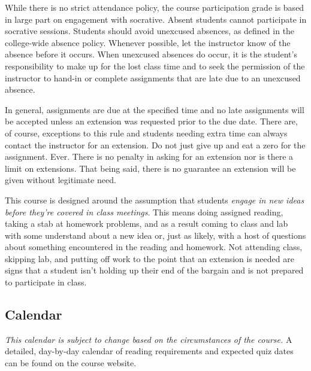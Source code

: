 \documentclass[10pt]{article}
\begin{document}
While there is no strict attendance policy, the course participation grade is based in large part on engagement with socrative. Absent students cannot participate in socrative sessions.  Students should avoid unexcused absences, as defined in the college-wide absence policy. Whenever possible, let the instructor know of the absence before it occurs. When unexcused absences do occur, it is the student's responsibility to make up for the lost class time and to seek the permission of the instructor to hand-in or complete assignments that are late due to an unexcused absence.

In general, assignments are due at the specified time and no late assignments will be accepted unless an extension was requested prior to the due date. There are, of course, exceptions to this rule and students needing extra time can always contact the instructor for an extension. Do not just give up and eat a zero for the assignment. Ever. There is no penalty in asking for an extension nor is there a limit on extensions.  That being said, there is no guarantee an extension will be given without legitimate need.

This course is designed around the assumption that students \textit{engage in new ideas before they're covered in class meetings}.  This means doing assigned reading, taking a stab at homework problems, and as a result coming to class and lab with some understand about a new idea or, just as likely, with a host of questions about something encountered in the reading and homework. Not attending class, skipping lab, and putting off work to the point that an extension is needed are signs that a student isn't holding up their end of the bargain and is not prepared to participate in class.

\subsection{Calendar}

\textit{This calendar is subject to change based on the circumstances of the course.} A detailed, day-by-day calendar of reading requirements and expected quiz dates can be found on the course website.
\end{document}
